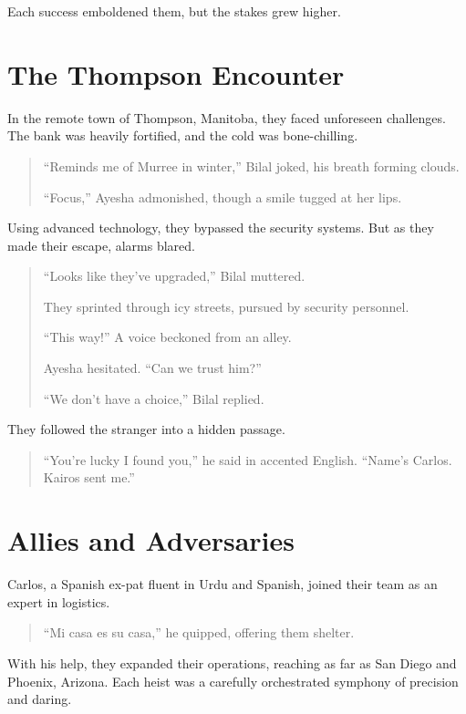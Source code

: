 \documentclass[12pt]{book}
\begin{document}
Each success emboldened them, but the stakes grew higher.

\chapter{The Thompson Encounter}

In the remote town of Thompson, Manitoba, they faced unforeseen challenges. The bank was heavily fortified, and the cold was bone-chilling.

\begin{quote}
    ``Reminds me of Murree in winter,'' Bilal joked, his breath forming clouds.

    ``Focus,'' Ayesha admonished, though a smile tugged at her lips.
\end{quote}

Using advanced technology, they bypassed the security systems. But as they made their escape, alarms blared.

\begin{quote}
    ``Looks like they've upgraded,'' Bilal muttered.

    They sprinted through icy streets, pursued by security personnel.

    ``This way!'' A voice beckoned from an alley.

    Ayesha hesitated. ``Can we trust him?''

    ``We don't have a choice,'' Bilal replied.
\end{quote}

They followed the stranger into a hidden passage.

\begin{quote}
    ``You're lucky I found you,'' he said in accented English. ``Name's Carlos. Kairos sent me.''
\end{quote}

\chapter{Allies and Adversaries}

Carlos, a Spanish ex-pat fluent in Urdu and Spanish, joined their team as an expert in logistics.

\begin{quote}
    ``Mi casa es su casa,'' he quipped, offering them shelter.
\end{quote}

With his help, they expanded their operations, reaching as far as San Diego and Phoenix, Arizona. Each heist was a carefully orchestrated symphony of precision and daring.
\end{document}
